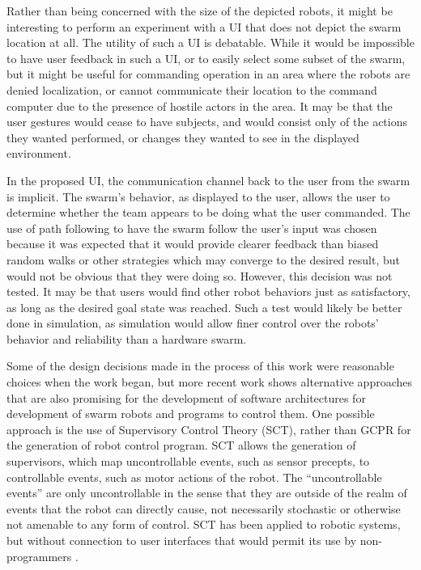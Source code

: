 Rather than being concerned with the size of the depicted robots, it might be interesting to perform an experiment with a UI that does not depict the swarm location at all. 
The utility of such a UI is debatable.
While it would be impossible to have user feedback in such a UI, or to easily select some subset of the swarm, but it might be useful for commanding operation in an area where the robots are denied localization, or cannot communicate their location to the command computer due to the presence of hostile actors in the area. 
It may be that the user gestures would cease to have subjects, and would consist only of the actions they wanted performed, or changes they wanted to see in the displayed environment. 
	
In the proposed UI, the communication channel back to the user from the swarm is implicit. 
The swarm's behavior, as displayed to the user, allows the user to determine whether the team appears to be doing what the user commanded. 
The use of path following to have the swarm follow the user's input was chosen because it was expected that it would provide clearer feedback than biased random walks or other strategies which may converge to the desired result, but would not be obvious that they were doing so. 
However, this decision was not tested. 
It may be that users would find other robot behaviors just as satisfactory, as long as the desired goal state was reached. 
Such a test would likely be better done in simulation, as simulation would allow finer control over the robots' behavior and reliability than a hardware swarm. 

Some of the design decisions made in the process of this work were reasonable choices when the work began, but more recent work shows alternative approaches that are also promising for the development of software architectures for development of swarm robots and programs to control them.
One possible approach is the use of Supervisory Control Theory (SCT), rather than GCPR for the generation of robot control program. 
SCT allows the generation of supervisors, which map uncontrollable events, such as sensor precepts, to controllable events, such as motor actions of the robot. 
The ``uncontrollable events'' are only uncontrollable in the sense that they are outside of the realm of events that the robot can directly cause, not necessarily stochastic or otherwise not amenable to any form of control. 
SCT has been applied to robotic systems, but without connection to user interfaces that would permit its use by non-programmers \citep{lopes2014application, lopes2016supervisory}.

